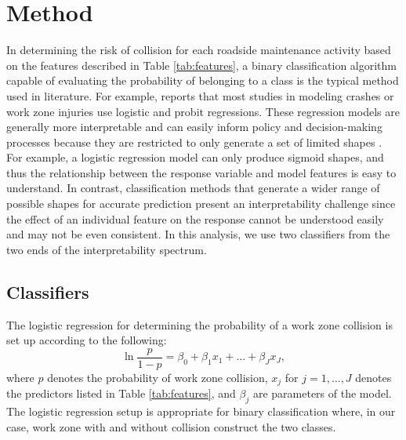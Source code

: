 \documentclass[10pt,a4paper]{article}
\begin{document}
\section{Method} \label{se:method}
In determining the risk of collision for each roadside maintenance activity based on the features described in Table \ref{tab:features}, a binary classification algorithm capable of evaluating the probability of belonging to a class is the typical method used in literature. For example, \cite{yang2015work} reports that most studies in modeling crashes or work zone injuries use logistic and probit regressions. These regression models are generally more interpretable and can easily inform policy and decision-making processes because they are restricted to only generate a set of limited shapes \citep[][Chapter 2]{james2013introduction}. For example, a logistic regression model can only produce sigmoid shapes, and thus the relationship between the response variable and model features is easy to understand. In contrast, classification methods that generate a wider range of possible shapes for accurate prediction present an interpretability challenge since the effect of an individual feature on the response cannot be understood easily and may not be even consistent. In this analysis, we use two classifiers from the two ends of the interpretability spectrum.

\subsection{Classifiers} \label{sse:classifier}
The logistic regression for determining the probability of a work zone collision is set up according to the following: 
\begin{equation*}
	\ln \frac{p}{1-p} = \beta_0 + \beta_1 x_1 + \ldots + \beta_{J} x_{J},
\end{equation*} where $p$ denotes the probability of work zone collision, $x_j$ for $j=1,\ldots,J$ denotes the predictors listed in Table \ref{tab:features}, and $\beta_j$ are parameters of the model. The logistic regression setup is appropriate for binary classification where, in our case, work zone with and without collision construct the two classes. 
\end{document}
